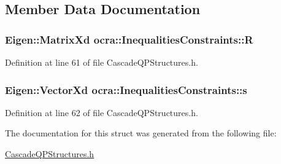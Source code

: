 \subsection{Member Data Documentation}
\subsubsection[{\texorpdfstring{R}{R}}]{\setlength{\rightskip}{0pt plus 5cm}Eigen\+::\+Matrix\+Xd ocra\+::\+Inequalities\+Constraints\+::R}\hypertarget{structocra_1_1InequalitiesConstraints_a855a07da37932011602005e3af25aa76}{}\label{structocra_1_1InequalitiesConstraints_a855a07da37932011602005e3af25aa76}


Definition at line 61 of file Cascade\+Q\+P\+Structures.\+h.

\subsubsection[{\texorpdfstring{s}{s}}]{\setlength{\rightskip}{0pt plus 5cm}Eigen\+::\+Vector\+Xd ocra\+::\+Inequalities\+Constraints\+::s}\hypertarget{structocra_1_1InequalitiesConstraints_a26db4bbe606a537c1dedbc30a2ca8f36}{}\label{structocra_1_1InequalitiesConstraints_a26db4bbe606a537c1dedbc30a2ca8f36}


Definition at line 62 of file Cascade\+Q\+P\+Structures.\+h.



The documentation for this struct was generated from the following file\+:\begin{DoxyCompactItemize}
\item 
\hyperlink{CascadeQPStructures_8h}{Cascade\+Q\+P\+Structures.\+h}\end{DoxyCompactItemize}
